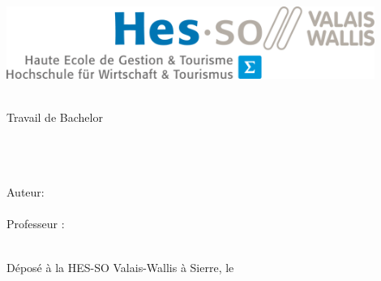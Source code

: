 
\begin{titlepage}
{\selectfont %
	\begin{flushright}
		\begin{minipage}{0.5\textwidth}
			\begin{flushleft}
			\end{flushleft}
		\end{minipage}%
		\begin{minipage}{0.5\textwidth}
			\begin{flushright}
				\includegraphics[width=0.9\textwidth]{img/hevslogo.png}
			\end{flushright}
		\end{minipage}

		~\\[1.5cm]
		
		{
		\Huge Travail de Bachelor\\[0.5cm]
		}
		
		{
		\LARGE \Orientation\\[0.5cm]
		~\\[1cm]
		}
		{
			\Huge
			\ThesisTitle \\[2cm]
		}
		{
			\large
			Auteur:\\[0cm]
			\Huge \Author \\[0.8cm]
		}
		{
			\large
			Professeur : \\
			\Huge \Advisor \\[0.8cm]
		}
		\vfill
		
		{Déposé à la \large HES-SO Valais-Wallis à Sierre, le \SubmissionDate}
		
	\end{flushright}
}
\restoregeometry
\end{titlepage}


